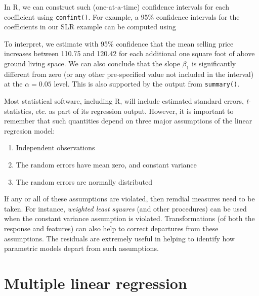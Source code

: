 \documentclass[]{krantz}
\makeatletter
\newenvironment{Shaded}{\begin{snugshade}}{\end{snugshade}}
\newcommand{\CommentTok}[1]{\textcolor[rgb]{0.37,0.37,0.37}{\textit{#1}}}
\newcommand{\DataTypeTok}[1]{\textcolor[rgb]{0.27,0.27,0.27}{#1}}
\newcommand{\FloatTok}[1]{\textcolor[rgb]{0.06,0.06,0.06}{#1}}
\newcommand{\KeywordTok}[1]{\textcolor[rgb]{0.27,0.27,0.27}{\textbf{#1}}}
\newcommand{\NormalTok}[1]{#1}
\providecommand{\tightlist}{%
  \setlength{\itemsep}{0pt}\setlength{\parskip}{0pt}}
\newenvironment{kframe}{%
\medskip{}
\setlength{\fboxsep}{.8em}
 \def\at@end@of@kframe{}%
 \ifinner\ifhmode%
  \def\at@end@of@kframe{\end{minipage}}%
  \begin{minipage}{\columnwidth}%
 \fi\fi%
 \def\FrameCommand##1{\hskip\@totalleftmargin \hskip-\fboxsep
 \colorbox{shadecolor}{##1}\hskip-\fboxsep
     \hskip-\linewidth \hskip-\@totalleftmargin \hskip\columnwidth}%
 \MakeFramed {\advance\hsize-\width
   \@totalleftmargin\z@ \linewidth\hsize
   \@setminipage}}%
 {\par\unskip\endMakeFramed%
 \at@end@of@kframe}
\renewenvironment{Shaded}{\begin{kframe}}{\end{kframe}}
\let\BeginKnitrBlock\begin \let\EndKnitrBlock\end
\makeatother
\begin{document}
In R, we can construct such (one-at-a-time) confidence intervals for each coefficient using \texttt{confint()}. For example, a 95\% confidence intervals for the coefficients in our SLR example can be computed using

\begin{Shaded}
\end{Shaded}

To interpret, we estimate with 95\% confidence that the mean selling price increases between 110.75 and 120.42 for each additional one square foot of above ground living space. We can also conclude that the slope \(\beta_1\) is significantly different from zero (or any other pre-specified value not included in the interval) at the \(\alpha = 0.05\) level. This is also supported by the output from \texttt{summary()}.

\BeginKnitrBlock{note}
Most statistical software, including R, will include estimated standard errors, \emph{t}-statistics, etc. as part of its regression output. However, it is important to remember that such quantities depend on three major assumptions of the linear regresion model:

\begin{enumerate}
\def\labelenumi{\arabic{enumi}.}
\tightlist
\item
  Independent observations
\item
  The random errors have mean zero, and constant variance
\item
  The random errors are normally distributed
\end{enumerate}

If any or all of these assumptions are violated, then remdial measures need to be taken. For instance, \emph{weighted least squares} (and other procedures) can be used when the constant variance assumption is violated. Transformations (of both the response and features) can also help to correct departures from these assumptions. The residuals are extremely useful in helping to identify how parametric models depart from such assumptions.
\EndKnitrBlock{note}

\hypertarget{multi-lm}{%
\section{Multiple linear regression}\label{multi-lm}}
\end{document}
